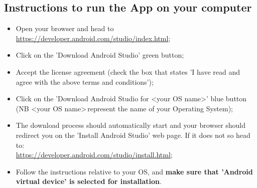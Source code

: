 \subsection{Instructions to run the App on your computer}
\label{subsect:Computer Instructions}
\begin{itemize}
	\item Open your browser and head to \\ \href{https://developer.android.com/studio/index.html}{\color{blue}https://developer.android.com/studio/index.html};
	\item Click on the 'Download Android Studio' green button;
	\item Accept the license agreement (check the box that states 'I have read and agree with the above terms and conditions');
	\item Click on the 'Download Android Studio for \textless your OS name\textgreater' blue button (NB \textless your OS name\textgreater  \,represent the name of your Operating System);
	\item The download process should automatically start and your browser should redirect you on the 'Install Android Studio' web page. If it does not so head to: \\ \href{https://developer.android.com/studio/install.html}{\color{blue}https://developer.android.com/studio/install.html};
	\item Follow the instructions relative to your OS, and \textbf{make sure that 'Android virtual device' is selected for installation}.
\end{itemize}
